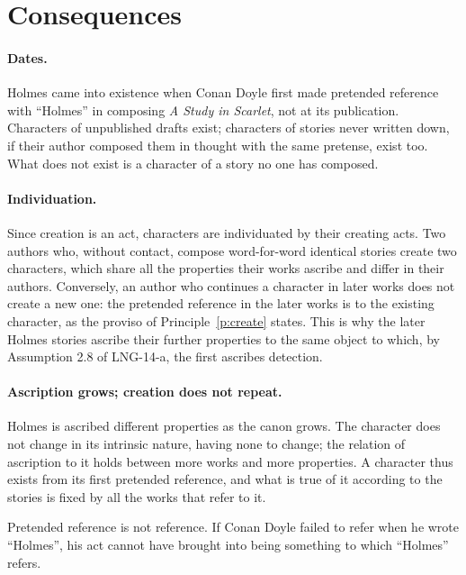 \documentclass{situationist-preprint}
\begin{document}
\section{Consequences}

\paragraph{Dates.} Holmes came into existence when Conan Doyle first made pretended reference with \enquote{Holmes} in composing \emph{A Study in Scarlet}, not at its publication. Characters of unpublished drafts exist; characters of stories never written down, if their author composed them in thought with the same pretense, exist too. What does not exist is a character of a story no one has composed.

\paragraph{Individuation.} Since creation is an act, characters are individuated by their creating acts. Two authors who, without contact, compose word-for-word identical stories create two characters, which share all the properties their works ascribe and differ in their authors. Conversely, an author who continues a character in later works does not create a new one: the pretended reference in the later works is to the existing character, as the proviso of Principle~\ref{p:create} states. This is why the later Holmes stories ascribe their further properties to the same object to which, by Assumption 2.8 of LNG-14-a, the first ascribes detection.

\paragraph{Ascription grows; creation does not repeat.} Holmes is ascribed different properties as the canon grows. The character does not change in its intrinsic nature, having none to change; the relation of ascription to it holds between more works and more properties. A character thus exists from its first pretended reference, and what is true of it according to the stories is fixed by all the works that refer to it.

\begin{objection}
Pretended reference is not reference. If Conan Doyle failed to refer when he wrote \enquote{Holmes}, his act cannot have brought into being something to which \enquote{Holmes} refers.
\end{objection}
\end{document}
